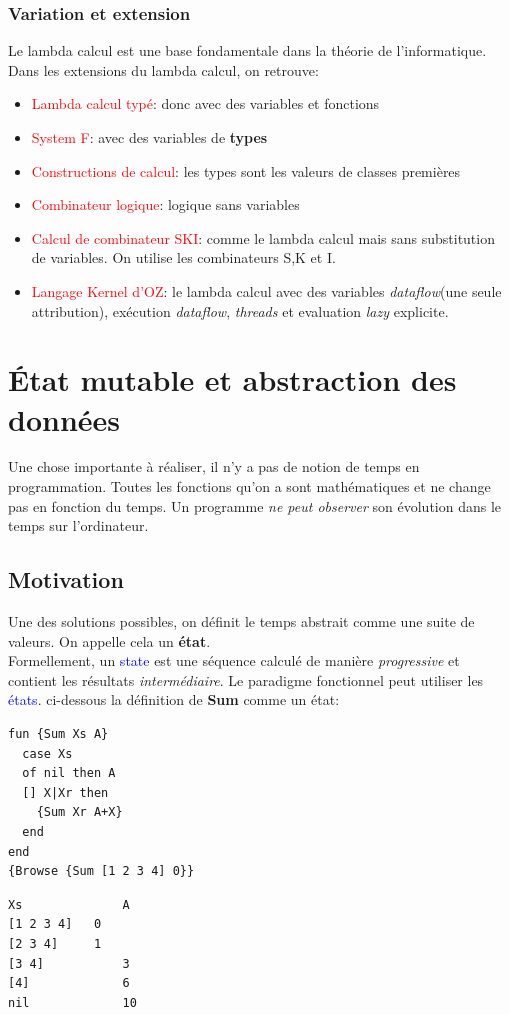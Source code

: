 \documentclass{report}
\begin{document}
\subsection{Variation et extension}
Le lambda calcul est une base fondamentale dans la théorie de l'informatique. Dans les extensions du lambda calcul, on retrouve:
\begin{itemize}
\item \textcolor{red}{Lambda calcul typé}: donc avec des variables et fonctions
\item \textcolor{red}{System F}: avec des variables de \textbf{types}
\item \textcolor{red}{Constructions de calcul}: les types sont les valeurs de classes premières
\item \textcolor{red}{Combinateur logique}: logique sans variables
\item \textcolor{red}{Calcul de combinateur SKI}: comme le lambda calcul mais sans substitution de variables. On utilise les combinateurs S,K et I.
\item \textcolor{red}{Langage Kernel d'OZ}: le lambda calcul avec des variables \textit{dataflow}(une seule attribution), exécution \textit{dataflow}, \textit{threads} et evaluation \textit{lazy} explicite.
\end{itemize}

\chapter{État mutable et abstraction des données}
Une chose importante à réaliser, il n'y a pas de notion de temps en programmation. Toutes les fonctions qu'on a sont mathématiques et ne change pas en fonction du temps. Un programme \textit{ne peut observer} son évolution dans le temps sur l'ordinateur.

\section{Motivation}
Une des solutions possibles, on définit le temps abstrait comme une suite de valeurs. On appelle cela un \textbf{état}. \\
Formellement, un \textcolor{blue}{state} est une séquence calculé de manière \textit{progressive} et contient les résultats \textit{intermédiaire}. Le paradigme fonctionnel peut utiliser les \textcolor{blue}{états}. ci-dessous la définition de \textbf{Sum} comme un état:
\begin{lstlisting}[escapechar=\%]
fun {Sum Xs A}
  case Xs
  of nil then A
  [] X|Xr then
    {Sum Xr A+X}
  end
end
{Browse {Sum [1 2 3 4] 0}}
\end{lstlisting}
\begin{lstlisting}[escapechar=\%]
Xs				A
[1 2 3 4]	0
[2 3 4]		1
[3 4]			3
[4]				6
nil				10    
\end{lstlisting}
\end{document}
